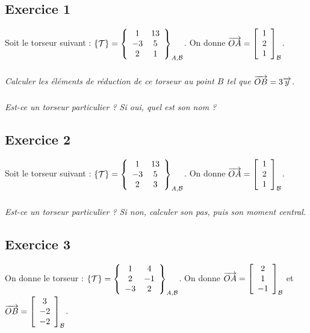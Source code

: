 \documentclass[10pt,oneside]{article}
\begin{document}
\subsection*{Exercice 1}
\setcounter{subparagraph}{0}
Soit le torseur suivant :
$\torseur{\mathcal{T}} = \torseurcol{1}{-3}{2}{13}{5}{1}{A,\mathcal{B}}$. On donne $\vect{OA}=\left[\begin{array}{c} 1 \\ 2 \\ 1\end{array}\right]_{\mathcal{B}}$.

\subparagraph{}
\textit{Calculer les éléments de réduction de ce torseur au point $B$ tel que $\vect{OB}=3\vect{y}$.}

\subparagraph{}
\textit{Est-ce un torseur particulier ? Si oui, quel est son nom ?}

\subsection*{Exercice 2}
\setcounter{subparagraph}{0}
Soit le torseur suivant :
$\torseur{\mathcal{T}} = \torseurcol{1}{-3}{2}{13}{5}{3}{A,\mathcal{B}}$. On donne $\vect{OA}=\left[\begin{array}{c} 1 \\ 2 \\ 1\end{array}\right]_{\mathcal{B}}$.

\subparagraph{}
\textit{Est-ce un torseur particulier ? Si non, calculer son pas, puis son moment central.}

\subsection*{Exercice 3}
\setcounter{subparagraph}{0}
On donne le torseur :
$\torseur{\mathcal{T}} = \torseurcol{1}{2}{-3}{4}{-1}{2}{A,\mathcal{B}}$. On donne $\vect{OA}=\left[\begin{array}{c} 2 \\ 1 \\ -1\end{array}\right]_{\mathcal{B}}$ et 
$\vect{OB}=\left[\begin{array}{c} 3 \\ -2 \\ -2\end{array}\right]_{\mathcal{B}}$.
\end{document}
